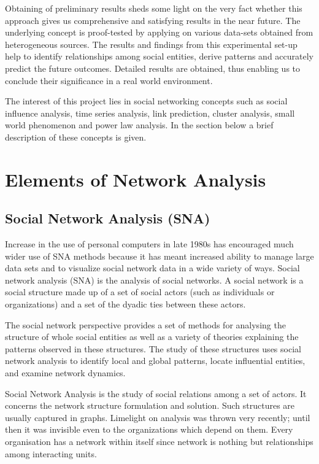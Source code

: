 Obtaining of preliminary results sheds some light on the very fact whether this approach gives us comprehensive and satisfying results in the near future. The underlying concept is proof-tested by applying on various data-sets obtained from heterogeneous sources. The results and findings from this experimental set-up help to identify relationships among social entities, derive patterns and accurately predict the future outcomes. Detailed results are obtained, thus enabling us to conclude their significance in a real world environment.

The interest of this project lies in social networking concepts such as social influence analysis, time series analysis, link prediction, cluster analysis, small world phenomenon and power law analysis. In the section below a brief description of these concepts is given.

\section{Elements of Network Analysis}

\subsection{Social Network Analysis (SNA)}

Increase in the use of personal computers in late 1980s has encouraged much wider use of SNA  methods because it has meant increased ability to manage large data sets and to visualize social network data in a wide variety of ways. Social network analysis (SNA) is the analysis of social networks. A social network is a social structure made up of a set of social actors (such as individuals or organizations) and a set of the dyadic ties between these actors.

The social network perspective provides a set of methods for analysing the structure of whole social entities as well as a variety of theories explaining the patterns observed in these structures. The study of these structures uses social network analysis to identify local and global patterns, locate influential entities, and examine network dynamics.

Social Network Analysis is the study of social relations among a set of actors. It concerns the network structure formulation and solution. Such structures are usually captured in graphs. Limelight on analysis was thrown very recently; until then it was invisible even to the organizations which depend on them. Every organisation has a network within itself since network is nothing but relationships among interacting units.

